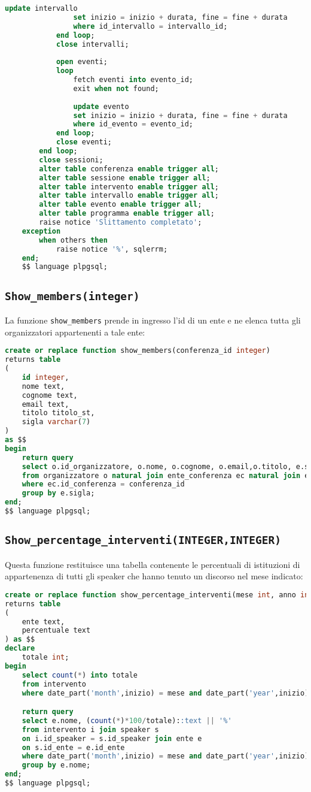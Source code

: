\begin{lstlisting}[language=SQL,style=mystyle]
				update intervallo
				set inizio = inizio + durata, fine = fine + durata
				where id_intervallo = intervallo_id;
			end loop;
			close intervalli;
			
			open eventi;
			loop
				fetch eventi into evento_id;
				exit when not found;
	
				update evento
				set inizio = inizio + durata, fine = fine + durata
				where id_evento = evento_id;
			end loop;
			close eventi;
		end loop;
		close sessioni;
        alter table conferenza enable trigger all;
        alter table sessione enable trigger all;
        alter table intervento enable trigger all;
        alter table intervallo enable trigger all;
        alter table evento enable trigger all;
        alter table programma enable trigger all;
        raise notice 'Slittamento completato';
	exception
		when others then
			raise notice '%', sqlerrm;
	end;
	$$ language plpgsql;
\end{lstlisting}

\subsection{\texttt{Show\_members(integer)}}
La funzione \texttt{show\_members} prende in ingresso l'id di un ente e ne elenca tutta gli organizzatori appartenenti a tale ente:
\begin{lstlisting}[language=SQL,style=mystyle]
create or replace function show_members(conferenza_id integer)
returns table 
(
    id integer, 
    nome text, 
    cognome text, 
    email text,
    titolo titolo_st, 
    sigla varchar(7)
) 
as $$
begin
    return query
    select o.id_organizzatore, o.nome, o.cognome, o.email,o.titolo, e.sigla
    from organizzatore o natural join ente_conferenza ec natural join ente e  
    where ec.id_conferenza = conferenza_id
    group by e.sigla;
end;
$$ language plpgsql;
\end{lstlisting}
\subsection{\texttt{Show\_percentage\_interventi(INTEGER,INTEGER)}}
Questa funzione restituisce una tabella contenente le percentuali di istituzioni di appartenenza di tutti gli speaker che hanno tenuto un discorso nel mese indicato:
\begin{lstlisting}[language=SQL,style=mystyle]
create or replace function show_percentage_interventi(mese int, anno int)
returns table
(
    ente text,
    percentuale text
) as $$
declare
    totale int;
begin
    select count(*) into totale
    from intervento
    where date_part('month',inizio) = mese and date_part('year',inizio) = anno;

    return query
    select e.nome, (count(*)*100/totale)::text || '%'
    from intervento i join speaker s 
    on i.id_speaker = s.id_speaker join ente e 
    on s.id_ente = e.id_ente
    where date_part('month',inizio) = mese and date_part('year',inizio) = anno
    group by e.nome;
end;
$$ language plpgsql;
\end{lstlisting}
